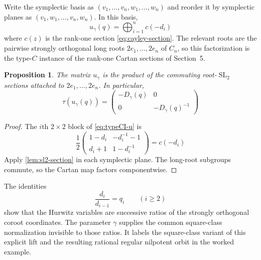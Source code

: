 \documentclass[11pt]{amsart}
\newtheorem{proposition}[proposition]{Proposition}
\theoremstyle{definition}
\theoremstyle{remark}
\newcommand{\SL}{\operatorname{SL}}
\begin{document}
Write the symplectic basis as $(v_1,\ldots,v_n,w_1,\ldots,w_n)$ and reorder it
by symplectic planes as $(v_1,w_1,\ldots,v_n,w_n)$.  In this basis,
\begin{equation}\label{eq:typeCI-block-factor}
 u_\gamma(q)
 =\bigoplus_{i=1}^n c(-d_i) 
\end{equation}
where $c(z)$ is the rank-one section \eqref{eq:cayley-section}.
The relevant roots are the pairwise strongly orthogonal long roots
$2e_1,\ldots,2e_n$ of $C_n$, so this factorization is the type-$C$ instance
of the rank-one Cartan sections of Section~5.

\begin{proposition}\label{prop:typeCI-rankone}
The matrix $u_\gamma$ is the product of the commuting root-$\SL_2$ sections
attached to $2e_1,\ldots,2e_n$.  In particular,
\begin{equation}\label{eq:typeCI-tau}
 \tau(u_\gamma(q))
 =\begin{pmatrix}-D_\gamma(q)&0\\0&-D_\gamma(q)^{-1}\end{pmatrix}
\end{equation}
\end{proposition}

\begin{proof}
The $i$th $2\times2$ block of \eqref{eq:typeCI-u} is
\[
 \frac12
 \begin{pmatrix}
 1-d_i&-d_i^{-1}-1\\
 d_i+1&1-d_i^{-1}
 \end{pmatrix}
 =c(-d_i)
\]
Apply \cref{lem:sl2-section} in each symplectic plane.  The long-root
subgroups commute, so the Cartan map factors componentwise.
\end{proof}

The identities
\[
 \frac{d_i}{d_{i-1}}=q_i\qquad(i\geq2)
\]
show that the Hurwitz variables are successive ratios of the strongly
orthogonal coroot coordinates.  The parameter $\gamma$ supplies the common
square-class normalization invisible to those ratios.  It labels the
square-class variant of this explicit lift and the resulting rational regular
nilpotent orbit in the worked example.
\end{document}
